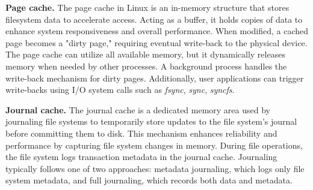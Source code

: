 \textbf{Page cache.} The page cache in Linux is an in-memory structure that stores filesystem data to accelerate access. Acting as a buffer, it holds copies of data to enhance system responsiveness and overall performance. When modified, a cached page becomes a "dirty page," requiring eventual write-back to the physical device. The page cache can utilize all available memory, but it dynamically releases memory when needed by other processes. A background process handles the write-back mechanism for dirty pages. Additionally, user applications can trigger write-backs using I/O system calls such as \textit{fsync}, \textit{sync}, \textit{syncfs}.



\textbf{Journal cache.} The journal cache is a dedicated memory area used by journaling file systems to temporarily store updates to the file system's journal before committing them to disk. This mechanism enhances reliability and performance by capturing file system changes in memory. During file operations, the file system logs transaction metadata in the journal cache. Journaling typically follows one of two approaches: metadata journaling, which logs only file system metadata, and full journaling, which records both data and metadata.



